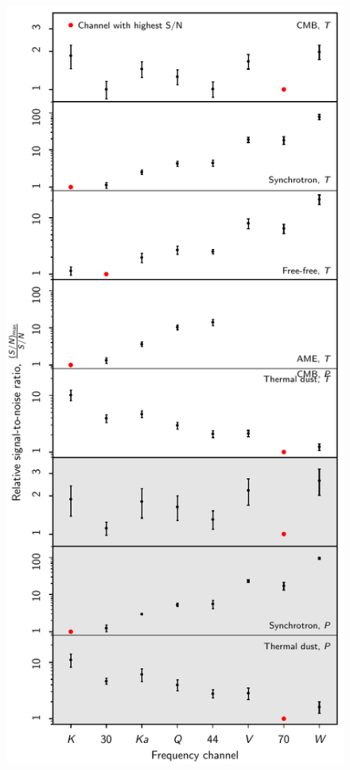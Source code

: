 \documentclass[twocolumn]{../../common/aa}
\begin{document}
\begin{figure}
  \center	
  \includegraphics[width=\linewidth]{figures/fg_s2n_v2.pdf}

\end{figure}
\end{document}
